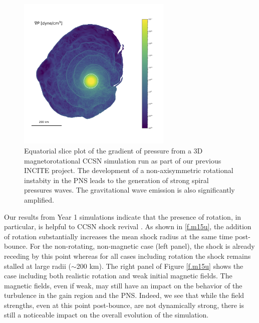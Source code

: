 \documentclass[12pt]{article}
\begin{document}
\begin{figure}
    \includegraphics[width=2.9in]{./fig_gradp_m25_o110_b9_0566.png}
    \caption{Equatorial slice plot of the gradient of pressure from a 3D magnetorotational CCSN simulation run as part of our previous INCITE project. The development of a non-axisymmetric rotational instabity in the PNS leads to the generation of strong spiral pressures waves. The gravitational wave emission is also significantly amplified.}
    \label{f.gradp}
\end{figure}
Our results from Year 1 simulations indicate that the presence of rotation, in particular, is helpful to CCSN shock revival \citep[e.g.,][]{summa:2018}. 
As shown in \ref{f.m15u}, the addition of rotation substantially increases the mean shock radius at the same time post-bounce. 
For the non-rotating, non-magnetic case (left panel), the shock is already receding by this point whereas for all cases including rotation the shock remains stalled at large radii ($\sim$200 km).
The right panel of Figure \ref{f.m15u} shows the case including both realistic rotation and weak initial magnetic fields.
The magnetic fields, even if weak, may still have an impact on the behavior of the turbulence in the gain region and the PNS.
Indeed, we see that while the field strengths, even at this point post-bounce, are not dynamically strong, there is still a noticeable impact on the overall evolution of the simulation. 
\end{document}
